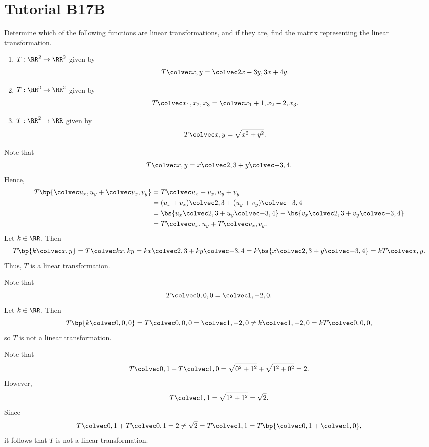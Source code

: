 \section{Tutorial B17B}

\begin{problem}
    Determine which of the following functions are linear transformations, and if they are, find the matrix representing the linear transformation.

    \begin{enumerate}
        \item $T : \RR^2 \to \RR^2$ given by \[T\cvecii{x}{y} = \cvecii{2x-3y}{3x+4y}.\]
        \item $T : \RR^3 \to \RR^3$ given by \[T\cveciii{x_1}{x_2}{x_3} = \cveciii{x_1+1}{x_2-2}{x_3}.\]
        \item $T : \RR^2 \to \RR$ given by \[T\cvecii{x}{y} = \sqrt{x^2 + y^2}.\]
    \end{enumerate}
\end{problem}
\begin{solution}
    \begin{ppart}
        Note that \[T\cvecii{x}{y} = x \cvecii23 + y \cvecii{-3}{4}.\] Hence,
        \begin{align*}
            T\bp{\cvecii{u_x}{u_y} + \cvecii{v_x}{v_y}} &= T\cvecii{u_x + v_x}{u_y + v_y}\\
            &= (u_x + v_x) \cvecii23 + (u_y + v_y) \cvecii{-3}{4}\\
            &= \bs{u_x \cvecii23 + u_y \cvecii{-3}{4}} + \bs{v_x \cvecii23 + v_y \cvecii{-3}{4}}\\
            &= T\cvecii{u_x}{u_y} + T\cvecii{v_x}{v_y}.
        \end{align*}
        Let $k \in \RR$. Then \[T\bp{k\cvecii{x}{y}} = T\cvecii{kx}{ky} = kx \cvecii23 + ky \cvecii{-3}{4} = k \bs{x \cvecii23 + y \cvecii{-3}4} = k T\cvecii{x}{y}.\] Thus, $T$ is a linear transformation.
    \end{ppart}
    \begin{ppart}
        Note that \[T\cveciii000 = \cveciii{1}{-2}{0}.\] Let $k \in \RR$. Then \[T\bp{k\cveciii000} = T\cveciii000 = \cveciii{1}{-2}{0} \neq k \cveciii{1}{-2}{0} = kT\cveciii000,\] so $T$ is not a linear transformation.
    \end{ppart}
    \begin{ppart}
        Note that \[T\cvecii01 + T\cvecii10 = \sqrt{0^2 + 1^2} + \sqrt{1^2 + 0^2} = 2.\] However, \[T\cvecii11 = \sqrt{1^2 + 1^2} = \sqrt2.\] Since \[T\cvecii01 + T\cvecii01 = 2 \neq \sqrt2 = T\cvecii11 = T\bp{\cvecii01 + \cvecii10},\] it follows that $T$ is not a linear transformation.
    \end{ppart}
\end{solution}

